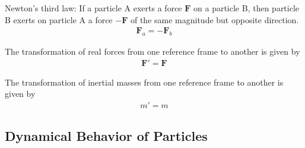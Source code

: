 \documentclass[12pt]{article}
\newcommand{\yN}{\newpage}%
\newcommand{\yS}{\medskip}%
\newcommand{\cA}{\centering}%
\newcommand{\cS}{\cA\subsection}%
\newcommand{\cs}[1]{}%
\newcommand{\vF}{\mathbf{F}}
\newcommand{\mM}{m}
\newcommand{\rt}{'}
\newcommand{\ra}{_a}
\newcommand{\rb}{_b}
\begin{document}
\yN \baselineskip=14.5pt \enlargethispage{0em}

\par Newton's third law: If a particle A exerts a force $\vF$ on a particle B, then particle B exerts on particle A a force $-\vF$ of the same magnitude but opposite direction.
\begin{eqnarray*}
\vF\ra = -\vF\rb
\end{eqnarray*}
\par The transformation of real forces from one reference frame to another is given by
\begin{eqnarray*}
\vF\rt = \vF
\end{eqnarray*}
\par The transformation of inertial masses from one reference frame to another is given by
\begin{eqnarray*}
\mM\rt = \mM
\end{eqnarray*}

\yS \vspace{-2.1em}

{\cs{Dynamical Behavior of Particles}}
{\cS{Dynamical Behavior of Particles}}
\end{document}
